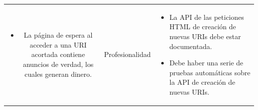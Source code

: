 \documentclass{article}
\begin{document}
\begin{table}[hbtp]
\begin{tabulary}{\textwidth}{ C L }
\begin{itemize}
        \item La página de espera al acceder a una URI acortada contiene anuncios de verdad, los cuales generan dinero.
	\end{itemize} &
 
    Profesionalidad & 
    \begin{itemize}
        \item La API de las peticiones HTML de creación de nuevas URIs debe estar documentada.
	    \item Debe haber una serie de pruebas automáticas sobre la API de creación de nuevas URIs.
    \end{itemize}
 
    \end{tabulary}
\end{table}
 
\end{document}
